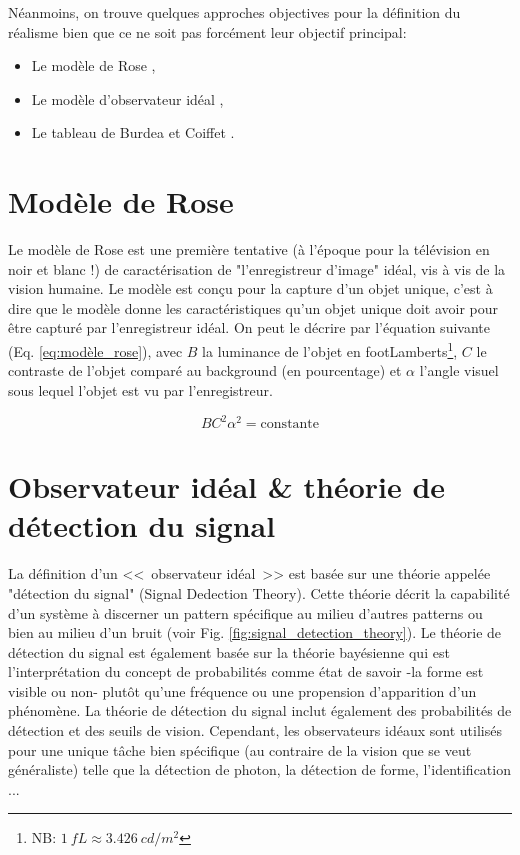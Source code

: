 	\par Néanmoins, on trouve quelques approches objectives pour la définition du réalisme bien que ce ne soit pas forcément leur objectif principal:	
		\begin{itemize}
			\item Le modèle de Rose \citep{rose_sensitivity_1948,burgess_rose_1999},
			\item Le modèle d'observateur idéal \citep{geisler_ideal_2003},
			\item Le tableau de Burdea et Coiffet \citep{burdea_realite_1993}.
		\end{itemize}
		
		\section{Modèle de Rose}		
		\par Le modèle de Rose est une première tentative (à l'époque pour la télévision en noir et blanc !) de caractérisation de "l'enregistreur d'image" idéal, vis à vis de la vision humaine. Le modèle est conçu pour la capture d'un objet unique, c'est à dire que le modèle donne les caractéristiques qu'un objet unique doit avoir pour être capturé par l'enregistreur idéal. On peut le décrire par l'équation  suivante (Eq. \ref{eq:modèle_rose}), avec $B$ la luminance de l'objet en footLamberts\footnote{NB: $1~fL \approx 3.426~cd/m^2$}, $C$ le contraste de l'objet comparé au background (en pourcentage) et $\alpha$ l'angle visuel sous lequel l'objet est vu par l'enregistreur.
		
		\begin{equation}
			BC^2\alpha^2 = \text{constante}
			\label{eq:modèle_rose} 
		\end{equation}
		
		\section{Observateur idéal \& théorie de détection du signal}		
		\par La définition d'un <<~observateur idéal~>> est basée sur une théorie appelée "détection du signal" (Signal Dedection Theory). Cette théorie décrit la capabilité d'un système à discerner un pattern spécifique au milieu d'autres patterns ou bien au milieu d'un bruit (voir Fig. \ref{fig:signal_detection_theory}). Le théorie de détection du signal est également basée sur la théorie bayésienne qui est l'interprétation du concept de probabilités comme état de savoir -la forme est visible ou non- plutôt qu'une fréquence ou une propension d'apparition d'un phénomène. La théorie de détection du signal inclut également des probabilités de détection et des seuils de vision. Cependant, les observateurs idéaux sont utilisés pour une unique tâche bien spécifique (au contraire de la vision que se veut généraliste) telle que la détection de photon, la détection de forme, l'identification ...
		
